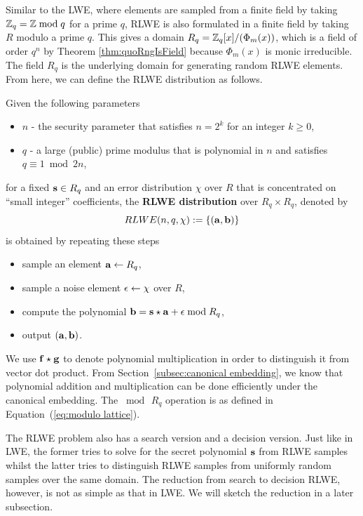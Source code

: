 \documentclass[../main.tex]{subfiles}
\begin{document}
Similar to the LWE, where elements are sampled from a finite field by taking $\mathbb{Z}_q = \mathbb{Z} \bmod q$ for a prime $q$, RLWE is also formulated in a finite field by taking $R$ modulo a prime $q$. This gives a domain $R_q=\mathbb{Z}_q[x]/(\Phi_m(x))$, which is a field of order $q^n$ by Theorem \ref{thm:quoRngIsField} because $\Phi_m(x)$ is monic irreducible. The field $R_q$ is the underlying domain for generating random RLWE elements. From here, we can define the RLWE distribution as follows. 

\begin{definition}
\label{def:rlwe1}
Given the following parameters
\begin{itemize}\itemsep1mm\parskip0mm
    \item $n$ - the security parameter that satisfies $n=2^k$ for an integer $k \ge 0$,
    \item $q$ - a large (public) prime modulus that is polynomial in $n$ and satisfies $q \equiv 1 \bmod 2n$,
\end{itemize}
for a fixed $\mathbf{s} \in R_q$ and an error distribution $\chi$ over $R$ that is concentrated on ``small integer'' coefficients, the \textbf{RLWE distribution} 
\reversemarginpar
{}
over $R_q \times R_q$, denoted by 
\begin{equation*}
    RLWE(n,q,\chi) := \{(\mathbf{a},\mathbf{b})\}
\end{equation*}
is obtained by repeating these steps 
\begin{itemize}\itemsep1mm\parskip0mm
    \item sample an element $\mathbf{a} \leftarrow R_q$,
    \item sample a noise element $\mathbf{\epsilon} \leftarrow \chi$ over $R$,
    \item compute the polynomial $\mathbf{b} = \mathbf{s} \star \mathbf{a} + \mathbf{\epsilon} \bmod R_q$,
    \item output $(\mathbf{a},\mathbf{b})$.
\end{itemize}
\end{definition}

We use $\mathbf{f} \star \mathbf{g}$ to denote polynomial multiplication in order to distinguish it from vector dot product. From Section~\ref{subsec:canonical embedding}, we know that polynomial addition and multiplication can be done efficiently under the canonical embedding. 
The $\bmod \,R_q$ operation is as defined in Equation~(\ref{eq:modulo lattice}).

The RLWE problem also has a search version and a decision version. Just like in LWE, the former tries to solve for the secret polynomial $\mathbf{s}$ from RLWE samples whilst the latter tries to distinguish RLWE samples from uniformly random samples over the same domain. The reduction from search to decision RLWE, however, is not as simple as that in LWE. We will sketch the reduction in a later subsection. 
\end{document}
